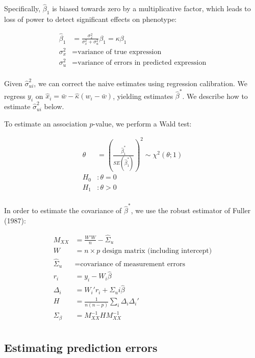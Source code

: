 \documentclass[11pt]{article}
\begin{document}
Specifically, \(\hat\beta_1\) is biased towards zero by a multiplicative factor,
which leads to loss of power to detect significant effects on phenotype:

\begin{align*}
  \hat\beta_1 &= \frac{\sigma_x^2}{\sigma_x^2 + \sigma_u^2} \beta_1 = \kappa \beta_1\\
  \sigma_x^2 &= \text{variance of true expression}\\
  \sigma_u^2 &= \text{variance of errors in predicted expression}\\
\end{align*}

Given \(\hat\sigma_{ui}^2\), we can correct the naive estimates using regression
calibration. We regress \(y_i\) on \(\hat x_i = \bar w - \hat\kappa (w_i - \bar
w)\), yielding estimates \(\hat\beta^*\). We describe how to estimate
\(\hat\sigma_{ui}^2\) below.

To estimate an association \(p\)-value, we perform a Wald test:

\begin{align*}
  \theta &= \left(\frac{\hat\beta_1^*}{SE(\hat\beta_1^*)}\right)^2 \sim \chi^2(\theta; 1)\\
  H_0&: \theta = 0\\
  H_1&: \theta > 0\\
\end{align*}

In order to estimate the covariance of \(\hat\beta^*\), we use the robust
estimator of Fuller (1987):

\begin{align*}
  M_{XX} &= \frac{W' W}{n} - \hat\Sigma_u\\
  W &= \text{$n \times p$ design matrix (including intercept)}\\
  \hat\Sigma_u &= \text{covariance of measurement errors}\\
  r_i &= y_i - W_i \hat\beta\\
  \Delta_i &= W_i' r_i + \Sigma_ui \hat\beta\\
  H &= \frac{1}{n(n - p)} \sum_i \Delta_i \Delta_i'\\
  \Sigma_\beta &= M_{XX}^{-1} H M_{XX}^{-1}\\
\end{align*}

\subsection{Estimating prediction errors}
\end{document}
